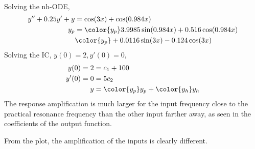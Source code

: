 \begin{enumerate}
\begin{enumerate}
\begin{align}
                    \end{align}
                    Solving the nh-ODE,
                    \begin{align}
                        y'' + 0.25y' + y & = \cos(3x) + \cos(0.984x)                              \\
                        y_{p}            & = \color{y_p} 3.9985 \sin(0.984x) + 0.516 \cos(0.984x) \\
                                         & \color{y_p} + 0.0116 \sin(3x) - 0.124\cos(3x)
                    \end{align}
                    Solving the IC, $ y(0) = 2, y'(0) = 0 $,
                    \begin{align}
                        y(0) = 2  & = c_{1} + 100                               \\
                        y'(0) = 0 & = 5c_{2}                                    \\
                        y         & = {\color{y_p} y_{p}} + {\color{y_h} y_{h}}
                    \end{align}
                    The response amplification is much larger for the input frequency close to
                    the practical resonance frequency than the other input farther away, as seen
                    in the coefficients of the output function.

                    \begin{figure}[H]
                        \centering
                    \end{figure}
                    From the plot, the amplification of the inputs is clearly different.


\end{enumerate}
\end{enumerate}
